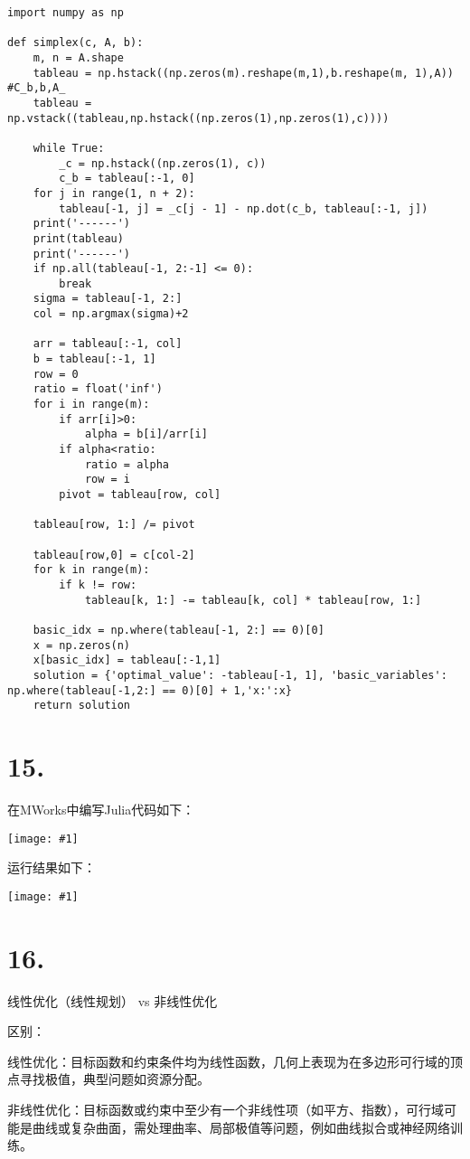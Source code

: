 \documentclass{article}
\newcommand{\p}[1]{\texttt{[image: \#1]}}
\begin{document}
	\begin{lstlisting}
import numpy as np

def simplex(c, A, b):
	m, n = A.shape
	tableau = np.hstack((np.zeros(m).reshape(m,1),b.reshape(m, 1),A)) #C_b,b,A_
	tableau = np.vstack((tableau,np.hstack((np.zeros(1),np.zeros(1),c))))

	while True:
    	_c = np.hstack((np.zeros(1), c))
	    c_b = tableau[:-1, 0]
	for j in range(1, n + 2):
	    tableau[-1, j] = _c[j - 1] - np.dot(c_b, tableau[:-1, j])
	print('------')
	print(tableau)
	print('------')
	if np.all(tableau[-1, 2:-1] <= 0):
    	break
	sigma = tableau[-1, 2:]
	col = np.argmax(sigma)+2
	
	arr = tableau[:-1, col]
	b = tableau[:-1, 1]
	row = 0
	ratio = float('inf')
	for i in range(m):
		if arr[i]>0:
		    alpha = b[i]/arr[i]
		if alpha<ratio:
		    ratio = alpha
		    row = i
		pivot = tableau[row, col]
	
	tableau[row, 1:] /= pivot
	
	tableau[row,0] = c[col-2]
    for k in range(m):
   	    if k != row:
        	tableau[k, 1:] -= tableau[k, col] * tableau[row, 1:]
	
	basic_idx = np.where(tableau[-1, 2:] == 0)[0]
	x = np.zeros(n)
	x[basic_idx] = tableau[:-1,1] 
	solution = {'optimal_value': -tableau[-1, 1], 'basic_variables': np.where(tableau[-1,2:] == 0)[0] + 1,'x:':x}
	return solution
	\end{lstlisting}
	
	\section*{15.}
	
	在MWorks中编写Julia代码如下：
	
	\p{15-1}
	
	运行结果如下：
	
	\p{15-2}
	
	\section*{16.}
	
	线性优化（线性规划） vs 非线性优化
	
	区别：
	
	线性优化：目标函数和约束条件均为线性函数，几何上表现为在多边形可行域的顶点寻找极值，典型问题如资源分配。
	
	非线性优化：目标函数或约束中至少有一个非线性项（如平方、指数），可行域可能是曲线或复杂曲面，需处理曲率、局部极值等问题，例如曲线拟合或神经网络训练。
	
\end{document}
